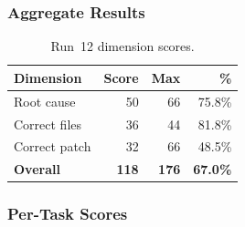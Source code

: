 \subsubsection{Aggregate Results}

\begin{table}[h]
\centering
\caption{Run~12 dimension scores.}\label{tab:r12-dim}
\begin{tabular}{lrrr}
\toprule
\textbf{Dimension} & \textbf{Score} & \textbf{Max} & \textbf{\%} \\
\midrule
Root cause         & 50 & 66 & 75.8\% \\
Correct files      & 36 & 44 & 81.8\% \\
Correct patch      & 32 & 66 & 48.5\% \\
\midrule
\textbf{Overall}   & \textbf{118} & \textbf{176} & \textbf{67.0\%} \\
\bottomrule
\end{tabular}
\end{table}

\subsubsection{Per-Task Scores}


